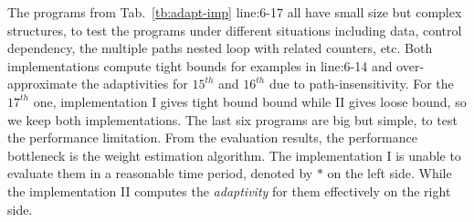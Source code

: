 %
The programs from Tab.~\ref{tb:adapt-imp} line:6-17 all have small size but complex structures, to test the programs under different situations including
data, control dependency,
the multiple paths nested loop with related counters, etc.
Both implementations compute tight bounds for examples in line:6-14
and over-approximate the adaptivities for $15^{th}$ and $16^{th}$ due to path-insensitivity.
For the $17^{th}$ one, implementation I gives tight bound bound while II gives loose bound, so we keep both implementations.
The last six programs are big but simple,
to test the performance limitation. 
From the evaluation results, the performance bottleneck is the weight estimation algorithm.
The implementation I
is unable to evaluate them in a reasonable time period, denoted by $*$ on the left side.
While the implementation II computes the \emph{adaptivity} for
them effectively on the right side. 

